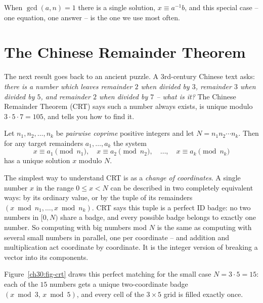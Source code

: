 When $\gcd(a,n) = 1$ there is a single solution, $x \equiv a^{-1} b$, and this
special case -- one equation, one answer -- is the one we use most often.

\section{The Chinese Remainder Theorem}
\label{ch30:crt}

The next result goes back to an ancient puzzle. A 3rd-century
Chinese text asks: \emph{there is a number which leaves remainder $2$ when
divided by $3$, remainder $3$ when divided by $5$, and remainder $2$ when divided
by $7$ -- what is it?} The Chinese Remainder Theorem (CRT) says such a number
always exists, is unique modulo $3\cdot5\cdot7 = 105$, and tells you how to find
it.

\begin{theorem}
\label{ch30:thm-crt}
Let $n_1, n_2, \dots, n_k$ be \emph{pairwise coprime} positive integers and let
$N = n_1 n_2 \cdots n_k$. Then for any target remainders $a_1, \dots, a_k$ the
system
\[
  x \equiv a_1 \pmod{n_1},\quad
  x \equiv a_2 \pmod{n_2},\quad \dots,\quad
  x \equiv a_k \pmod{n_k}
\]
has a unique solution $x$ modulo $N$.
\end{theorem}

\begin{intuitionbox}
The simplest way to understand CRT is as a \emph{change of coordinates}. A single
number $x$ in the range $0 \le x < N$ can be described in two completely
equivalent ways: by its ordinary value, or by the tuple of its remainders
$(x \bmod n_1, \dots, x \bmod n_k)$. CRT says this tuple is a perfect ID badge:
no two numbers in $[0,N)$ share a badge, and every possible badge belongs to
exactly one number. So computing with big numbers mod $N$ is the same as
computing with several small numbers in parallel, one per coordinate -- and
addition and multiplication act coordinate by coordinate. It is the integer
version of breaking a vector into its components.
\end{intuitionbox}

Figure~\ref{ch30:fig-crt} draws this perfect matching for the small case $N = 3\cdot 5 =
15$: each of the $15$ numbers gets a unique two-coordinate badge $(x \bmod 3,\,
x \bmod 5)$, and every cell of the $3 \times 5$ grid is filled exactly once.

